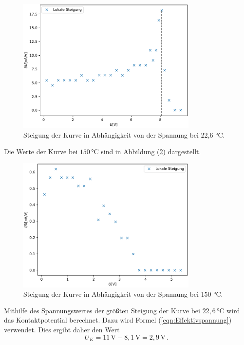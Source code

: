 \begin{figure}[H]
    \centering
    \includegraphics[width=0.8\textwidth]{plot1.pdf}
    \caption{Steigung der Kurve in Abhängigkeit von der Spannung bei 22,6 °C.}
    \label{fig:22,6_Steigung}
\end{figure}

Die Werte der Kurve bei $150 \, \unit{\celsius}$ sind 
in Abbildung (\ref{fig:150_Steigung}) dargestellt. 

\begin{figure}[H]
    \centering
    \includegraphics[width=0.8\textwidth]{plot2.pdf}
    \caption{Steigung der Kurve in Abhängigkeit von der Spannung bei 150 °C.}
    \label{fig:150_Steigung}
\end{figure}
Mithilfe des Spannungswertes der größten Steigung der Kurve bei $22,6 \, \unit{\celsius}$ wird das Kontaktpotential berechnet. 
Dazu wird Formel (\ref{eqn:Effektivspannung}) verwendet. Dies ergibt daher den Wert
$$U_K = 11 \, \unit{\volt} - 8,1  \, \unit{\volt} = 2,9 \, \unit{\volt}\, .$$
